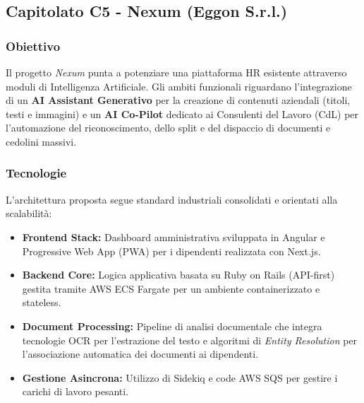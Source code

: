 \documentclass[a4paper, 10pt, colorlinks=true, linkcolor=black, urlcolor=blue, citecolor=blue, hidelinks]{article}
\begin{document}
\begin{itemize}
\subsection{Capitolato C5 - Nexum (Eggon S.r.l.)}

\subsubsection{Obiettivo}
Il progetto \textit{Nexum} punta a potenziare una piattaforma HR esistente attraverso moduli di Intelligenza Artificiale. Gli ambiti funzionali riguardano l'integrazione di un \textbf{AI Assistant Generativo} per la creazione di contenuti aziendali (titoli, testi e immagini) e un \textbf{AI Co-Pilot} dedicato ai Consulenti del Lavoro (CdL) per l'automazione del riconoscimento, dello split e del dispaccio di documenti e cedolini massivi.

\subsubsection{Tecnologie}
L'architettura proposta segue standard industriali consolidati e orientati alla scalabilità:
\begin{itemize}
    \item \textbf{Frontend Stack:} Dashboard amministrativa sviluppata in Angular e Progressive Web App (PWA) per i dipendenti realizzata con Next.js.
    \item \textbf{Backend Core:} Logica applicativa basata su Ruby on Rails (API-first) gestita tramite AWS ECS Fargate per un ambiente containerizzato e stateless.
    \item \textbf{Document Processing:} Pipeline di analisi documentale che integra tecnologie OCR per l'estrazione del testo e algoritmi di \textit{Entity Resolution} per l'associazione automatica dei documenti ai dipendenti.
    \item \textbf{Gestione Asincrona:} Utilizzo di Sidekiq e code AWS SQS per gestire i carichi di lavoro pesanti.
\end{itemize}


\end{itemize}
\end{document}
